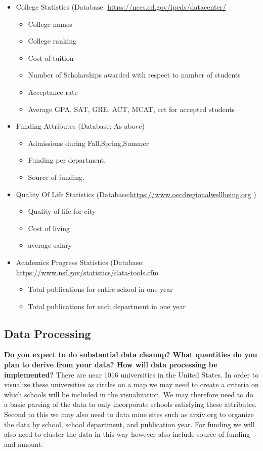 \documentclass[11pt, a4paper]{article}
\begin{document}
\begin{itemize}
  \setlength\itemsep{0.5em}
\item College Statistics (Database: \href{https://nces.ed.gov/ipeds/datacenter/}{https://nces.ed.gov/ipeds/datacenter/}
  \begin{itemize}
\item College names
\item College ranking
\item Cost of tuition
\item Number of Scholarships awarded with respect to number of students
\item Acceptance rate
\item Average GPA, SAT, GRE, ACT, MCAT, ect for accepted students
\end{itemize}
\item Funding Attributes (Database: As above)
  \begin{itemize}
\item Admissions during Fall,Spring,Summer
\item Funding per department.
\item Source of funding.
\end{itemize}
\item Quality Of Life Statistics (Database:\href{https://www.oecdregionalwellbeing.org}{https://www.oecdregionalwellbeing.org} )
  \begin{itemize}
\item Quality of life for city
\item Cost of living
\item average salary
\end{itemize}
\item Academics Progress Statistics (Database: \href{https://www.nsf.gov/statistics/data-tools.cfm}{https://www.nsf.gov/statistics/data-tools.cfm}
  \begin{itemize}
  \item Total publications for entire school in one year
  \item Total publications for each department in one year
    \end{itemize}
\end{itemize}
\subsection{Data Processing}\textbf{ Do you expect to do substantial data cleanup? What quantities do you plan to derive from your data? How will data processing be implemented?}
  There are near 1016 universities in the United States. In order to visualize these universities as circles on a map we may need to create a criteria on which schools will be included in the visualization. We may therefore need to do a basic parsing of the data to only incorporate schools satisfying these attributes. Second to this we may also need to data mine sites such as arxiv.org to organize the data by school, school department, and publication year. For funding we will also need to cluster the data in this way however also include source of funding and amount. 
\end{document}
